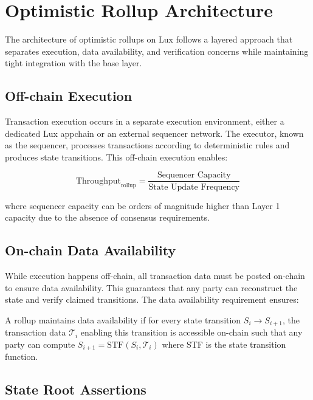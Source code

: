 \section{Optimistic Rollup Architecture}


The architecture of optimistic rollups on Lux follows a layered approach that separates execution, data availability, and verification concerns while maintaining tight integration with the base layer.

\subsection{Off-chain Execution}

Transaction execution occurs in a separate execution environment, either a dedicated Lux appchain or an external sequencer network. The executor, known as the sequencer, processes transactions according to deterministic rules and produces state transitions. This off-chain execution enables:

\begin{equation}
\text{Throughput}_{\text{rollup}} = \frac{\text{Sequencer Capacity}}{\text{State Update Frequency}}
\end{equation}

where sequencer capacity can be orders of magnitude higher than Layer 1 capacity due to the absence of consensus requirements.

\subsection{On-chain Data Availability}

While execution happens off-chain, all transaction data must be posted on-chain to ensure data availability. This guarantees that any party can reconstruct the state and verify claimed transitions. The data availability requirement ensures:

\begin{definition}
A rollup maintains data availability if for every state transition $S_i \rightarrow S_{i+1}$, the transaction data $\mathcal{T}_i$ enabling this transition is accessible on-chain such that any party can compute $S_{i+1} = \text{STF}(S_i, \mathcal{T}_i)$ where STF is the state transition function.
\end{definition}

\subsection{State Root Assertions}

